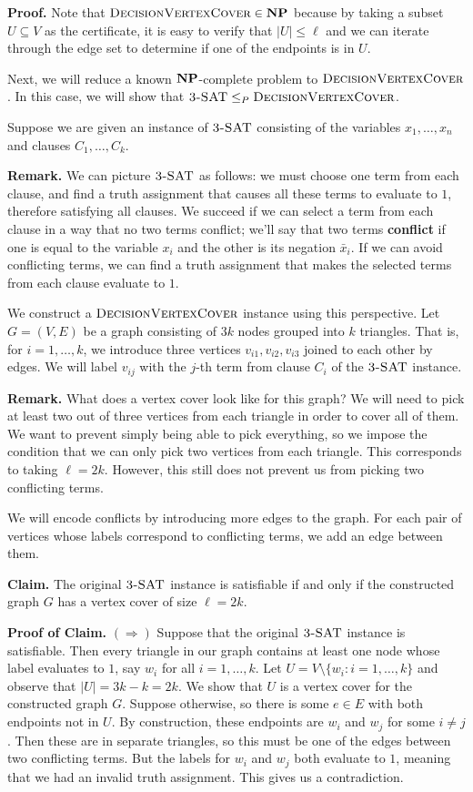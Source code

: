\documentclass{article}
\DeclareMathOperator{\NP}{{\bf NP}}
\DeclareMathOperator{\SAT}{\textsc{3-SAT}}
\DeclareMathOperator{\DecisionVertexCover}{\textsc{DecisionVertexCover}}
\begin{document}
{\color{blue}
{\bf Proof.} Note that $\DecisionVertexCover \in \NP$ because 
by taking a subset $U \subseteq V$ as the certificate, it is easy to 
verify that $|U| \leq \ell$ and we can iterate through the edge 
set to determine if one of the endpoints is in $U$. 

Next, we will reduce a known $\NP$-complete problem to $\DecisionVertexCover$. 
In this case, we will show that $\SAT \leq_P \DecisionVertexCover$. 

Suppose we are given an instance of $\SAT$ consisting of the variables
$x_1, \dots, x_n$ and clauses $C_1, \dots, C_k$. 

{\color{red} {\bf Remark.} We can picture 
$\SAT$ as follows: we must choose one term from each clause, and 
find a truth assignment that causes all these terms to evaluate to $1$, 
therefore satisfying all clauses. We succeed if we can select a term 
from each clause in a way that no two terms conflict; we'll say that 
two terms {\bf conflict} if one is equal to the variable $x_i$ 
and the other is its negation $\bar x_i$. If we can avoid conflicting 
terms, we can find a truth assignment that makes the selected terms 
from each clause evaluate to $1$.}

We construct a $\DecisionVertexCover$ instance using this perspective. 
Let $G = (V, E)$ be a graph consisting of $3k$ nodes grouped into $k$ 
triangles. That is, for $i = 1, \dots, k$, we introduce three 
vertices $v_{i1}, v_{i2}, v_{i3}$ joined to each other by edges. 
We will label $v_{ij}$ with the $j$-th term from clause $C_i$ of the $\SAT$ instance.

{\color{red} {\bf Remark.} What does a vertex cover look like for this graph? We will need to 
pick at least two out of three vertices from each triangle 
in order to cover all of them. We want to prevent simply being 
able to pick everything, so we impose the condition that we can only 
pick two vertices from each triangle. This corresponds to taking 
$\ell = 2k$. However, this still does not prevent us from picking 
two conflicting terms.}

We will encode conflicts by introducing more edges to the graph. 
For each pair of vertices whose labels correspond to conflicting terms, 
we add an edge between them. 

{\bf Claim.} The original $\SAT$ instance is satisfiable if and only if 
the constructed graph $G$ has a vertex cover of size $\ell = 2k$. 

{\bf Proof of Claim.} 
$(\Rightarrow)$ Suppose that the original $\SAT$ instance is satisfiable. 
Then every triangle in our graph contains at least one node whose label 
evaluates to $1$, say $w_i$ for all $i = 1, \dots, k$. Let 
$U = V \setminus \{w_i : i = 1, \dots, k\}$ and observe that 
$|U| = 3k - k = 2k$. We show that $U$ is a vertex cover for the constructed 
graph $G$. Suppose otherwise, so there is some $e \in E$ with both 
endpoints not in $U$. By construction, these endpoints are 
$w_i$ and $w_j$ for some $i \neq j$. Then these are in separate triangles, 
so this must be one of the edges between two conflicting terms. But 
the labels for $w_i$ and $w_j$ both evaluate to $1$, meaning that 
we had an invalid truth assignment. This gives us a contradiction.

}
\end{document}
